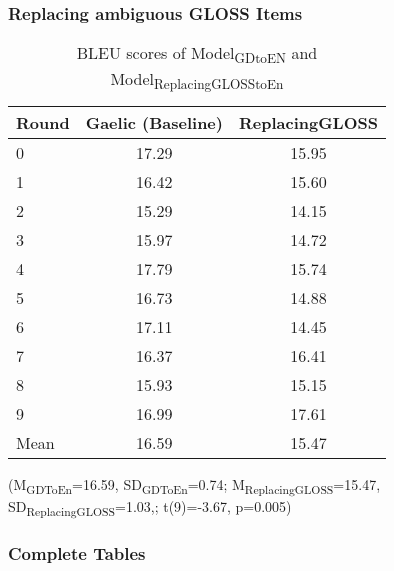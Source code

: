 \documentclass[a4paper]{article}
\begin{document}
\subsubsection{Replacing ambiguous GLOSS Items}\label{treatment:ReplacingGloss}
\begin{table}[ht]
\centering
\begin{tabular}{lcc}
  \hline
Round & Gaelic (Baseline) & ReplacingGLOSS \\ 
  \hline
0 & 17.29 & 15.95 \\ 
  1 & 16.42 & 15.60 \\ 
  2 & 15.29 & 14.15 \\ 
  3 & 15.97 & 14.72 \\ 
  4 & 17.79 & 15.74 \\ 
  5 & 16.73 & 14.88 \\ 
  6 & 17.11 & 14.45 \\ 
  7 & 16.37 & 16.41 \\ 
  8 & 15.93 & 15.15 \\ 
  9 & 16.99 & 17.61 \\ 
   \hline
Mean & 16.59 & 15.47 \\ 
   \hline
\end{tabular}
\caption{BLEU scores of Model\textsubscript{GDtoEN} and Model\textsubscript{ReplacingGLOSStoEn}} 
\label{Table:ReplacingGLOSS}
\end{table}(M\textsubscript{GDToEn}=16.59, SD\textsubscript{GDToEn}=0.74; M\textsubscript{ReplacingGLOSS}=15.47, SD\textsubscript{ReplacingGLOSS}=1.03,; t(9)=-3.67, p=0.005)

\subsubsection{Complete Tables}
\end{document}

